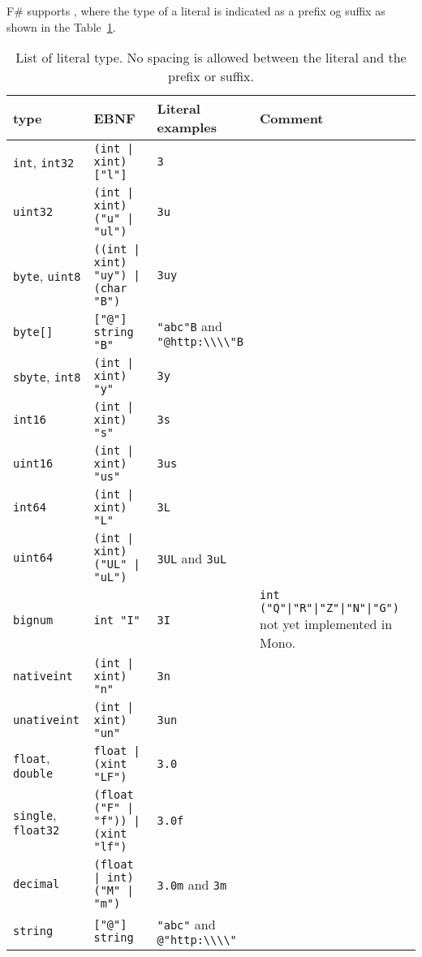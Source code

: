 F\# supports , where the type of a literal is indicated as a prefix og suffix as shown in the Table~\ref{tab:literalTypes}.
\begin{table}
  \centering
  \begin{tabularx}{\linewidth}{|l|l|l|X|}
    \hline
    type & EBNF & Literal examples & Comment \\
    \hline
    \lstinline!int!, \lstinline!int32! & \lstinline[language=ebnf]!(int | xint) ["l"]!  & \lstinline!3! & \\
    \lstinline!uint32! & \lstinline[language=ebnf]!(int | xint) ("u" | "ul")! & \lstinline!3u! & \\
    \lstinline!byte!, \lstinline!uint8! & \lstinline[language=ebnf]!((int | xint) "uy") | (char "B")!  & \lstinline!3uy!  & \\
    \lstinline!byte[]! & \lstinline[language=ebnf]!["@"] string "B"!  & \lstinline!"abc"B! and \lstinline!"@http:\\\\"B!  & \\
    \lstinline!sbyte!, \lstinline!int8! & \lstinline[language=ebnf]!(int | xint) "y"! & \lstinline!3y!  & \\
    \lstinline!int16! & \lstinline[language=ebnf]!(int | xint) "s"!  & \lstinline!3s!  & \\
    \lstinline!uint16! & \lstinline[language=ebnf]!(int | xint) "us"! & \lstinline!3us!  & \\
    \lstinline!int64! & \lstinline[language=ebnf]!(int | xint) "L"!  & \lstinline!3L!  & \\
    \lstinline!uint64! & \lstinline[language=ebnf]!(int | xint) ("UL" | "uL")!  & \lstinline!3UL! and \lstinline!3uL!  & \\
    \lstinline!bignum! & \lstinline[language=ebnf]!int "I"! & \lstinline!3I!  & \lstinline[language=ebnf]!int ("Q"|"R"|"Z"|"N"|"G")! not yet implemented in Mono.\\
    \lstinline!nativeint! & \lstinline[language=ebnf]!(int | xint) "n"! & \lstinline!3n!  & \\
    \lstinline!unativeint! & \lstinline[language=ebnf]!(int | xint) "un"!  & \lstinline!3un!  & \\
    \lstinline!float!, \lstinline!double! & \lstinline[language=ebnf]!float | (xint "LF")!  & \lstinline!3.0!  & \\
    \lstinline!single!, \lstinline!float32! & \lstinline[language=ebnf]!(float ("F" | "f")) | (xint "lf") !  & \lstinline!3.0f!  & \\
    \lstinline!decimal! &\lstinline[language=ebnf]!(float | int) ("M" | "m")! & \lstinline!3.0m! and \lstinline!3m!  & \\
    \lstinline!string! & \lstinline[language=ebnf]!["@"] string!  & \lstinline!"abc"! and \lstinline!@"http:\\\\"!  & \\
    \hline
  \end{tabularx}
  \caption{List of literal type. No spacing is allowed between the literal and the prefix or suffix.}
  \label{tab:literalTypes}
\end{table}
